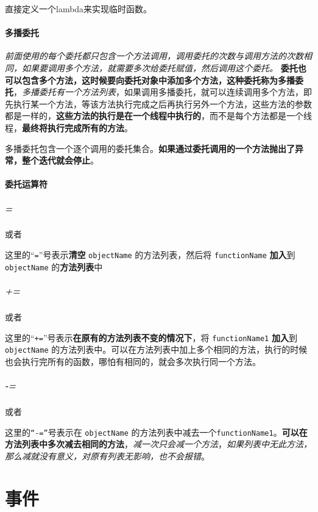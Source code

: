 \documentclass[UTF8,a4paper,12pt]{ctexbook}
\begin{document}
		 	直接定义一个lambda来实现临时函数。
		 	
		 \paragraph{多播委托} 
		 	
		 	\textit{前面使用的每个委托都只包含一个方法调用，调用委托的次数与调用方法的次数相同，如果要调用多个方法，就需要多次给委托赋值，然后调用这个委托。}
		 	\textbf{委托也可以包含多个方法，这时候要向委托对象中添加多个方法，这种委托称为多播委托}，\textit{多播委托有一个方法列表}，如果调用多播委托，就可以连续调用多个方法，即先执行某一个方法，等该方法执行完成之后再执行另外一个方法，这些方法的参数都是一样的，\textbf{这些方法的执行是在一个线程中执行的}，而不是每个方法都是一个线程，\textbf{最终将执行完成所有的方法}。
		 	
		 	多播委托包含一个逐个调用的委托集合。\textbf{如果通过委托调用的一个方法抛出了异常，整个迭代就会停止}。
		 
		 \paragraph{委托运算符} 
		 	\subparagraph{=}	 
		 		或者 
		 		
		 		这里的“\verb|=|”号表示\textbf{清空} \verb|objectName| 的方法列表，然后将 \verb|functionName| \textbf{加入}到 \verb|objectName| 的\textbf{方法列表}中	 	
		 	
		 	\subparagraph{+=} 	 
		 		或者 
		 			 		
		 		这里的“\verb|+=|”号表示\textbf{在原有的方法列表不变的情况下}，将 \verb|functionName1|  \textbf{加入}到 \verb|objectName| 的方法列表中。可以在方法列表中加上多个相同的方法，执行的时候也会执行完所有的函数，哪怕有相同的，就会多次执行同一个方法。
		 		
		 	\subparagraph{-=}	 
		 		或者 
		 		
		 		这里的\verb|“-=”|号表示在 \verb|objectName| 的方法列表中减去一个\verb|functionName1|。\textbf{可以在方法列表中多次减去相同的方法}，\textit{减一次只会减一个方法}，\textit{如果列表中无此方法，那么减就没有意义，对原有列表无影响，也不会报错}。
		 		
	\section{事件}
\end{document}
